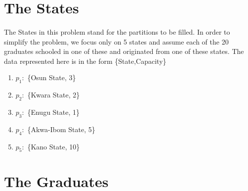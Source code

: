 \documentclass[a4paper]{book}
\begin{document}
		\section{The States}
			\paragraph{}
				The States in this problem stand for the partitions to be filled. In order to simplify the problem, we focus only on 5 states and assume each of the 20 graduates schooled in one of these and originated from one of these states. The data represented here is in the form \{State,Capacity\}
				\begin{enumerate}
					\item $p_1\colon$ \{Osun State, 3\}
					\item $p_2\colon$ \{Kwara State, 2\}
					\item $p_3\colon$ \{Enugu State, 1\}
					\item $p_4\colon$ \{Akwa-Ibom State, 5\}
					\item $p_5\colon$ \{Kano State, 10\}
				\end{enumerate}
		\section{The Graduates}
\end{document}
